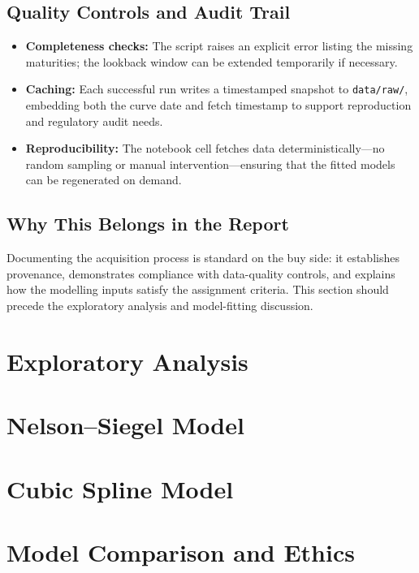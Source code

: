 \documentclass[12pt]{article}
\newcommand{\inlinecode}[1]{\texttt{#1}}
\begin{document}
\begin{spacing}{1.15}
\subsection{Quality Controls and Audit Trail}
\begin{itemize}
    \item \textbf{Completeness checks:} The script raises an explicit error listing the missing maturities; the lookback window can be extended temporarily if necessary.
    \item \textbf{Caching:} Each successful run writes a timestamped snapshot to \inlinecode{data/raw/}, embedding both the curve date and fetch timestamp to support reproduction and regulatory audit needs.
    \item \textbf{Reproducibility:} The notebook cell fetches data deterministically---no random sampling or manual intervention---ensuring that the fitted models can be regenerated on demand.
\end{itemize}

\subsection{Why This Belongs in the Report}
Documenting the acquisition process is standard on the buy side: it establishes provenance, demonstrates compliance with data-quality controls, and explains how the modelling inputs satisfy the assignment criteria. This section should precede the exploratory analysis and model-fitting discussion.
\end{spacing}

\section{Exploratory Analysis}
\begin{spacing}{1.15}
\end{spacing}

\section{Nelson--Siegel Model}
\begin{spacing}{1.15}
\end{spacing}

\section{Cubic Spline Model}
\begin{spacing}{1.15}
\end{spacing}

\section{Model Comparison and Ethics}
\begin{spacing}{1.15}
\end{spacing}

\printbibliography
\end{document}
